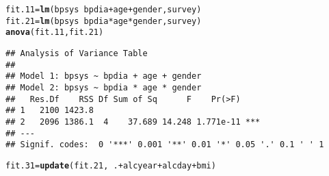 \documentclass{article}\usepackage[]{graphicx}\usepackage[]{color}
\makeatletter
\newcommand{\hlopt}[1]{\textcolor[rgb]{0,0,0}{#1}}%
\newcommand{\hlstd}[1]{\textcolor[rgb]{0.345,0.345,0.345}{#1}}%
\newcommand{\hlkwb}[1]{\textcolor[rgb]{0.69,0.353,0.396}{#1}}%
\newcommand{\hlkwd}[1]{\textcolor[rgb]{0.737,0.353,0.396}{\textbf{#1}}}%
\newenvironment{kframe}{%
 \def\at@end@of@kframe{}%
 \ifinner\ifhmode%
  \def\at@end@of@kframe{\end{minipage}}%
  \begin{minipage}{\columnwidth}%
 \fi\fi%
 \def\FrameCommand##1{\hskip\@totalleftmargin \hskip-\fboxsep
 \colorbox{shadecolor}{##1}\hskip-\fboxsep
     \hskip-\linewidth \hskip-\@totalleftmargin \hskip\columnwidth}%
 \MakeFramed {\advance\hsize-\width
   \@totalleftmargin\z@ \linewidth\hsize
   \@setminipage}}%
 {\par\unskip\endMakeFramed%
 \at@end@of@kframe}
\newenvironment{knitrout}{}{} %
\makeatother
\begin{document}
\begin{knitrout}
\color{fgcolor}\begin{kframe}
\begin{alltt}
\hlstd{fit.11} \hlkwb{=} \hlkwd{lm}\hlstd{(bpsys} \hlopt{~} \hlstd{bpdia}\hlopt{+}\hlstd{age}\hlopt{+}\hlstd{gender,survey)}
\hlstd{fit.21} \hlkwb{=} \hlkwd{lm}\hlstd{(bpsys} \hlopt{~} \hlstd{bpdia}\hlopt{*}\hlstd{age}\hlopt{*}\hlstd{gender,survey)}
\hlkwd{anova}\hlstd{(fit.11,fit.21)}
\end{alltt}
\begin{verbatim}
## Analysis of Variance Table
## 
## Model 1: bpsys ~ bpdia + age + gender
## Model 2: bpsys ~ bpdia * age * gender
##   Res.Df    RSS Df Sum of Sq      F    Pr(>F)    
## 1   2100 1423.8                                  
## 2   2096 1386.1  4    37.689 14.248 1.771e-11 ***
## ---
## Signif. codes:  0 '***' 0.001 '**' 0.01 '*' 0.05 '.' 0.1 ' ' 1
\end{verbatim}
\begin{alltt}
\hlstd{fit.31} \hlkwb{=} \hlkwd{update}\hlstd{(fit.21,} \hlopt{~}\hlstd{.} \hlopt{+} \hlstd{alcyear} \hlopt{+} \hlstd{alcday} \hlopt{+} \hlstd{bmi)}
\end{alltt}
\end{kframe}
\end{knitrout}
\end{document}
